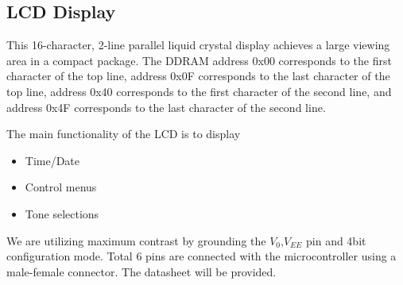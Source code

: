 \begin{minipage}{0.97\textwidth}
 \noindent{}\hfill
\end{minipage}



\subsection{LCD Display}

This 16-character, 2-line parallel liquid crystal display achieves a large viewing area in a compact package. The DDRAM address 0x00 corresponds to the first character of the top line, address 0x0F corresponds to the last character of the top line, address 0x40 corresponds to the first character of the second line, and address 0x4F corresponds to the last character of the second line.

The main functionality of the LCD is to display
\begin{itemize}
  \item Time/Date 
  \item Control menus
  \item Tone selections	
\end{itemize}
We are utilizing maximum contrast by grounding the $V_{0}$,$V_{EE}$ pin and 4bit configuration mode. Total 6 pins are connected with the microcontroller using a male-female connector. The datasheet will be provided.

